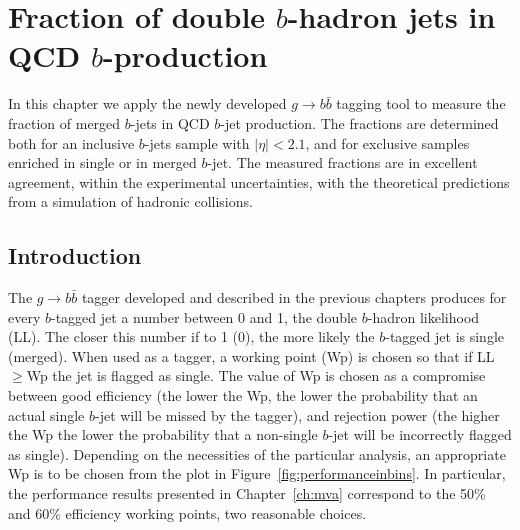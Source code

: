 %
\chapter{Fraction of double $b$-hadron jets in QCD $b$-production}\label{ch:gbbfraction}


In this chapter we apply the newly developed $g \rightarrow b\bar{b}$ tagging tool to measure the fraction of merged $b$-jets in QCD $b$-jet production. The fractions are determined both for an inclusive $b$-jets sample with $|\eta|<2.1$, and for exclusive samples enriched in single or in merged $b$-jet.
The measured fractions are in excellent agreement, within the experimental uncertainties, with the theoretical predictions from a simulation of hadronic collisions.


\section{Introduction}\label{sec:FitIntro}

The $g\rightarrow b\bar{b}$ tagger developed and described in the previous chapters produces for every $b$-tagged jet a number between 0 and 1, the double $b$-hadron likelihood (LL). The closer this number if to 1 (0), the more likely the $b$-tagged jet is single (merged). When used as a tagger, a working point (Wp) is chosen so that if LL$\geq$Wp the jet is flagged as single. The value of Wp is chosen as a compromise between good efficiency (the lower the Wp, the lower the probability that an actual single $b$-jet will be missed by the tagger), and rejection power (the higher the Wp the lower the probability that a non-single $b$-jet will be incorrectly flagged as single). Depending on the necessities of the particular analysis, an appropriate Wp is to be chosen from the plot in Figure~\ref{fig:performanceinbins}. In particular, the performance results presented in Chapter~\ref{ch:mva} correspond to the 50\% and 60\% efficiency working points, two reasonable choices.

